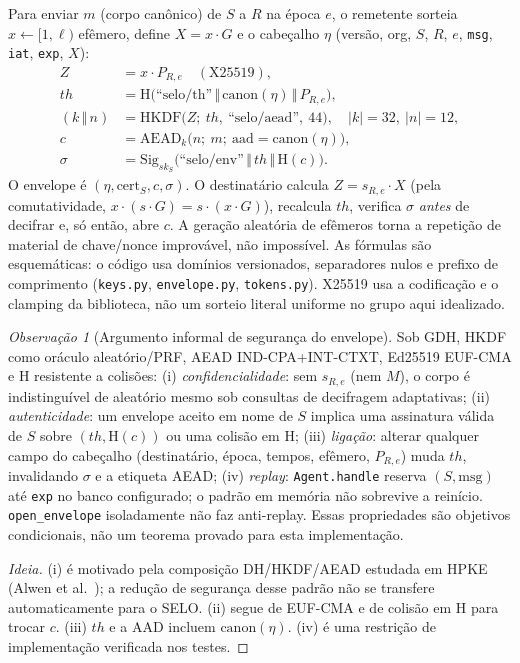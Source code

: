 \documentclass[11pt,a4paper]{article}
\theoremstyle{plain}
\theoremstyle{definition}
\theoremstyle{remark}
\newtheorem*{observacao}{Observação}
\newcommand{\HKDF}{\mathrm{HKDF}}
\newcommand{\Hash}{\mathrm{H}}
\newcommand{\cat}{\,\Vert\,}
\newcommand{\Sig}{\mathrm{Sig}}
\newcommand{\AEAD}{\mathrm{AEAD}}
\newcommand{\cod}[1]{\texttt{#1}}
\begin{document}
Para enviar $m$ (corpo canônico) de $S$ a $R$ na época $e$, o remetente sorteia $x\leftarrow[1,\ell)$ efêmero, define $X=x\cdot G$ e o cabeçalho $\eta$ (versão, org, $S$, $R$, $e$, \cod{msg}, \cod{iat}, \cod{exp}, $X$):
\begin{align}
Z &= x\cdot P_{R,e} \quad (\text{X25519}),\\
\mathit{th} &= \Hash\big(\text{``selo/th''}\cat \mathrm{canon}(\eta)\cat P_{R,e}\big),\\
(k\cat n) &= \HKDF\big(Z;\ \mathit{th},\ \text{``selo/aead''},\ 44\big),\quad |k|=32,\ |n|=12,\\
c &= \AEAD_k\big(n;\ m;\ \text{aad}=\mathrm{canon}(\eta)\big),\\
\sigma &= \Sig_{sk_S}\big(\text{``selo/env''}\cat \mathit{th}\cat \Hash(c)\big).
\end{align}
O envelope é $(\eta,\mathrm{cert}_S,c,\sigma)$. O destinatário calcula $Z=s_{R,e}\cdot X$ (pela comutatividade, $x\cdot(s\cdot G)=s\cdot(x\cdot G)$), recalcula $\mathit{th}$, verifica $\sigma$ \emph{antes} de decifrar e, só então, abre $c$. A geração aleatória de efêmeros torna a repetição de material de chave/nonce improvável, não impossível. As fórmulas são esquemáticas: o código usa domínios versionados, separadores nulos e prefixo de comprimento (\cod{keys.py}, \cod{envelope.py}, \cod{tokens.py}). X25519 usa a codificação e o clamping da biblioteca, não um sorteio literal uniforme no grupo aqui idealizado.

\begin{observacao}[Argumento informal de segurança do envelope]
Sob GDH, HKDF como oráculo aleatório/PRF, AEAD IND-CPA+INT-CTXT, Ed25519 EUF-CMA e $\Hash$ resistente a colisões: (i) \emph{confidencialidade}: sem $s_{R,e}$ (nem $M$), o corpo é indistinguível de aleatório mesmo sob consultas de decifragem adaptativas; (ii) \emph{autenticidade}: um envelope aceito em nome de $S$ implica uma assinatura válida de $S$ sobre $(\mathit{th},\Hash(c))$ ou uma colisão em $\Hash$; (iii) \emph{ligação}: alterar qualquer campo do cabeçalho (destinatário, época, tempos, efêmero, $P_{R,e}$) muda $\mathit{th}$, invalidando $\sigma$ e a etiqueta AEAD; (iv) \emph{replay}: \cod{Agent.handle} reserva $(S,\text{msg})$ até \cod{exp} no banco configurado; o padrão em memória não sobrevive a reinício. \cod{open\_envelope} isoladamente não faz anti-replay. Essas propriedades são objetivos condicionais, não um teorema provado para esta implementação.
\end{observacao}
\begin{proof}[Ideia]
(i) é motivado pela composição DH/HKDF/AEAD estudada em HPKE (Alwen et al.~\cite{hpkeanalysis}); a redução de segurança desse padrão não se transfere automaticamente para o SELO. (ii) segue de EUF-CMA e de colisão em $\Hash$ para trocar $c$. (iii) $\mathit{th}$ e a AAD incluem $\mathrm{canon}(\eta)$. (iv) é uma restrição de implementação verificada nos testes. \qedhere
\end{proof}
\end{document}

